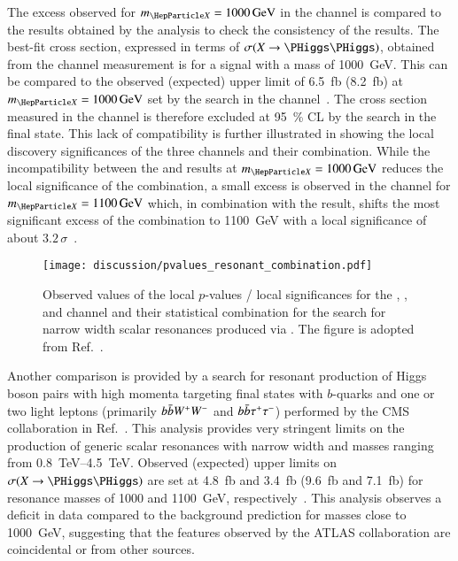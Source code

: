The excess observed for $\mX = \SI{1000}{\GeV}$ in the \bbtautau
channel is compared to the results obtained by the \bbbb analysis to
check the consistency of the results. The best-fit cross section,
expressed in terms of $\sigma(X \to \HH)$, obtained from the \bbtautau
channel measurement is  for a
signal with a mass of \SI{1000}{\GeV}. This can be compared to the
observed (expected) upper limit of \SI{6.5}{\femto\barn}
(\SI{8.2}{\femto\barn}) at $\mX = \SI{1000}{\GeV}$ set by the search
in the \bbbb channel~\cite{HDBS-2018-41,hepdata.111124}. The cross
section measured in the \bbtautau channel is therefore excluded at
\SI{95}{\percent} CL by the search in the \bbbb final state. This lack
of compatibility is further illustrated in
 showing the local discovery
significances of the three channels and their combination. While the
incompatibility between the \bbtautau and \bbbb results at
$\mX = \SI{1000}{\GeV}$ reduces the local significance of the
combination, a small excess is observed in the \bbbb channel for
$\mX = \SI{1100}{\GeV}$ which, in combination with the \bbtautau
result, shifts the most significant excess of the combination to
\SI{1100}{\GeV} with a local significance of about
$3.2\,\sigma$~\cite{ATLAS-CONF-2021-052}.


\begin{figure}[htbp]
  \centering

  \texttt{[image: discussion/pvalues\_resonant\_combination.pdf]}

  \caption{Observed values of the local $p$-values / local
    significances for the \bbbb, \bbtautau, and \bbyy channel and
    their statistical combination for the search for narrow width
    scalar resonances produced via \ggF. The figure is adopted from
    Ref.~\cite{ATLAS-CONF-2021-052}.}
  \label{fig:resonant_hh_comb_pvalues}

\end{figure}

Another comparison is provided by a search for resonant production of
Higgs boson pairs with high momenta targeting final states with
$b$-quarks and one or two light leptons (primarily $b\bar{b} W^+ W^-$
and $b\bar{b} \tau^+ \tau^-$) performed by the CMS collaboration in
Ref.~\cite{CMS-B2G-20-007}. This analysis provides very stringent
limits on the production of generic scalar resonances with narrow
width and masses ranging from \SIrange{0.8}{4.5}{\TeV}. Observed
(expected) upper limits on $\sigma(X \to \HH)$ are set at
\SI{4.8}{\femto\barn} and \SI{3.4}{\femto\barn} (\SI{9.6}{\femto\barn}
and \SI{7.1}{\femto\barn}) for resonance masses of \num{1000} and
\SI{1100}{\GeV},
respectively~\cite{CMS-B2G-20-007,hepdata.115024}. This analysis
observes a deficit in data compared to the background prediction for
masses close to \SI{1000}{\GeV}, suggesting that the features observed
by the ATLAS collaboration are coincidental or from other sources.

